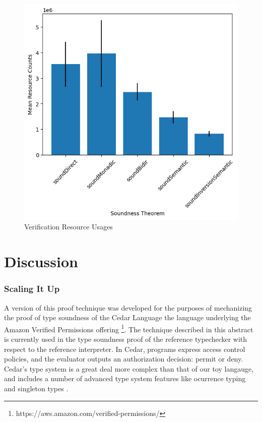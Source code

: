 \documentclass[sigplan,review,screen,anonymous]{acmart}
\begin{document}
\begin{figure}
  \includegraphics[scale=0.5]{costgraph.png}
  \caption{Verification Resource Usages}
  \label{fig:cost-results}
\end{figure}

\section{Discussion}
\label{sec:discussion}

\subsubsection*{Scaling It Up}
A version of this proof technique was developed for the purposes of mechanizing the proof of type soundness
of the Cedar Language \cite{cedar}
the language underlying the Amazon Verified Permissions offering \footnote{https://aws.amazon.com/verified-permissions/}.
The technique described in this abstract is currently used in the type soundness proof of the reference typechecker with respect to the reference interpreter.
In Cedar, programs express access control policies, and the evaluator outputs an authorization decision: permit or deny.
Cedar's type system is a great deal more complex than that of our toy langauge, and includes a number of advanced type system features like ocurrence typing \cite{typed-scheme} and
singleton types \cite{sing-types}.
\end{document}
